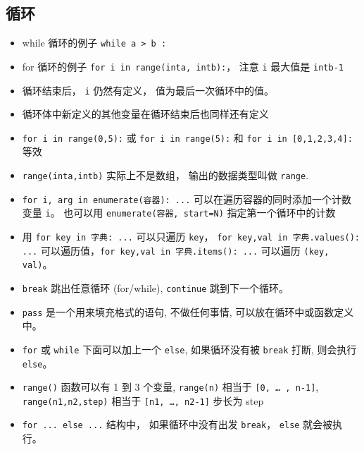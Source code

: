 \subsection{循环}
\begin{itemize}
\item while 循环的例子  \verb`while a > b :`
\item for 循环的例子 \verb`for i in range(inta, intb):`， 注意 \verb`i` 最大值是 \verb`intb-1`
\item 循环结束后， \verb`i` 仍然有定义， 值为最后一次循环中的值。
\item 循环体中新定义的其他变量在循环结束后也同样还有定义
\item \verb`for i in range(0,5):` 或 \verb`for i in range(5):` 和 \verb`for i in [0,1,2,3,4]:` 等效
\item \verb`range(inta,intb)` 实际上不是数组， 输出的数据类型叫做 \verb`range`.
\item \verb`for i, arg in enumerate(容器): ...` 可以在遍历容器的同时添加一个计数变量 \verb`i`。 也可以用 \verb`enumerate(容器, start=N)` 指定第一个循环中的计数
\item 用 \verb`for key in 字典: ...` 可以只遍历 \verb`key`， \verb`for key,val in 字典.values(): ...` 可以遍历值，\verb`for key,val in 字典.items(): ...` 可以遍历 \verb`(key, val)`。
\item \verb`break` 跳出任意循环 (for/while), \verb`continue` 跳到下一个循环。
\item \verb`pass` 是一个用来填充格式的语句, 不做任何事情, 可以放在循环中或函数定义中。
\item \verb`for` 或 \verb`while` 下面可以加上一个 \verb`else`, 如果循环没有被 \verb`break` 打断, 则会执行 \verb`else`。
\item \verb`range()` 函数可以有 1 到 3 个变量, \verb`range(n)` 相当于 \verb`[0, … , n-1]`, \verb`range(n1,n2,step)` 相当于 \verb`[n1, …, n2-1]` 步长为 step 
\item \verb`for ... else ...` 结构中， 如果循环中没有出发 \verb`break`， \verb`else` 就会被执行。
\end{itemize}

